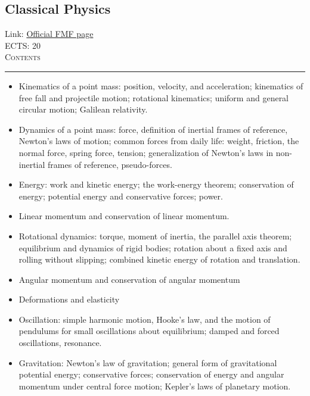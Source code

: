\documentclass[11pt, a4paper]{article}
\newenvironment{course}[3]{
\subsection{#1}%
Link: \href{#2}{Official FMF page}\\%
ECTS: #3%
\vspace{1ex}
\\
{\large \textsc{Contents}}\\[-0.9ex]%
\rule{\textwidth}{0.5pt}
\vspace{-3ex}
}
{}
\newenvironment{chapter}[1]{
\begin{tcolorbox}[title=#1, breakable]
}
{\end{tcolorbox}}
\begin{document}
\begin{course}{Classical Physics}{https://www.fmf.uni-lj.si/en/study-physics/programmes/1fiz/2020/7000777/courses/1154/}{20}
    \label{classical-physics}

\begin{chapter}{Mechanics}

    \begin{itemize}
    
        \item Kinematics of a point mass: position, velocity, and acceleration; kinematics of free fall and projectile motion; rotational kinematics; uniform and general circular motion; Galilean relativity.

        \item Dynamics of a point mass: force, definition of inertial frames of reference, Newton's laws of motion; common forces from daily life: weight, friction, the normal force, spring force, tension; generalization of Newton's laws in non-inertial frames of reference, pseudo-forces.
     
        \item Energy: work and kinetic energy; the work-energy theorem; conservation of energy; potential energy and conservative forces; power.

        \item Linear momentum and conservation of linear momentum.

        \item Rotational dynamics: torque, moment of inertia, the parallel axis theorem; equilibrium and dynamics of rigid bodies; rotation about a fixed axis and rolling without slipping; combined kinetic energy of rotation and translation.

        \item Angular momentum and conservation of angular momentum

        \item Deformations and elasticity

        \item Oscillation: simple harmonic motion, Hooke's law, and the motion of pendulums for small oscillations about equilibrium; damped and forced oscillations, resonance.

        \item Gravitation: Newton's law of gravitation; general form of gravitational potential energy; conservative forces; conservation of energy and angular momentum under central force motion; Kepler's laws of planetary motion.


\end{itemize}
\end{chapter}
\end{course}
\end{document}
